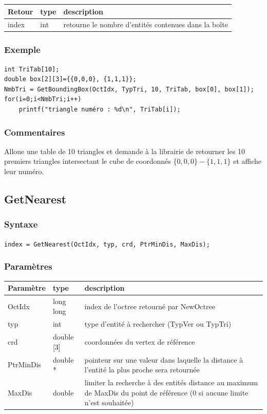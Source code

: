 \documentclass[a4paper,12pt]{article}
\begin{document}
\medskip

\begin{tabular}{|m{3cm}|m{2cm}|m{8.5cm}|}
\hline
Retour     & type   & description \\
\hline
index      & int    & retourne le nombre d'entités contenues dans la boîte \\
\hline
\end{tabular}

\subsubsection*{Exemple}

\begin{tt}
\begin{verbatim}
int TriTab[10];
double box[2][3]={{0,0,0}, {1,1,1}};
NmbTri = GetBoundingBox(OctIdx, TypTri, 10, TriTab, box[0], box[1]);
for(i=0;i<NmbTri;i++)
    printf("triangle numéro : %d\n", TriTab[i]);
\end{verbatim}
\end{tt}
\normalfont

\subsubsection*{Commentaires}
Alloue une table de 10 triangles et demande à la librairie de retourner les 10 premiers triangles intersectant le cube de coordonnés $\{0,0,0\} - \{1,1,1\}$ et affiche leur numéro.



\newpage
\subsection{GetNearest}
\subsubsection*{Syntaxe}
{\tt index = GetNearest(OctIdx, typ, crd, PtrMinDis, MaxDis);}
\subsubsection*{Paramètres}

\begin{tabular}{|m{3cm}|m{2cm}|m{8.5cm}|}
\hline
Paramètre  & type       & description \\
\hline
OctIdx     & long long  & index de l'octree retourné par NewOctree \\
\hline
typ        & int        & type d'entité à rechercher (TypVer ou TypTri) \\
\hline
crd        & double [3] & coordonnées du vertex de référence \\
\hline
PtrMinDis  & double *   & pointeur sur une valeur dans laquelle la distance à l'entité la plus proche sera retournée \\
\hline
MaxDis     & double     & limiter la recherche à des entités distance au maximum de MaxDis du point de référence (0 si aucune limite n'est souhaitée) \\
\hline
\end{tabular}
\end{document}
